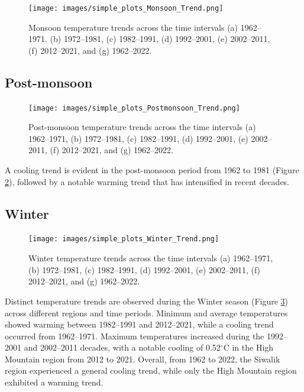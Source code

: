 \begin{figure}[H] 
  \centering
  \texttt{[image: images/simple\_plots\_Monsoon\_Trend.png]}  
  \caption{Monsoon temperature trends across the time intervals (a) 1962–1971, (b) 1972–1981, (c) 1982–1991, (d) 1992–2001, (e) 2002–2011, (f) 2012–2021, and (g) 1962–2022.} 
  \label{fig:Monsoon_temperature_trends}  
\end{figure}

\subsection*{Post-monsoon}

\begin{figure}[H] 
  \centering
  \texttt{[image: images/simple\_plots\_Postmonsoon\_Trend.png]}
  \caption{Post-monsoon temperature trends across the time intervals (a) 1962–1971, (b) 1972–1981, (c) 1982–1991, (d) 1992–2001, (e) 2002–2011, (f) 2012–2021, and (g) 1962–2022.}
  \label{fig:Post_monsoon_temperature_trends}  
\end{figure}

A cooling trend is evident in the post-monsoon period from 1962 to 1981 (Figure \ref{fig:Post_monsoon_temperature_trends}), followed by a notable warming trend that has intensified in recent decades.

\subsection*{Winter}

\begin{figure}[H] 
  \centering
  \texttt{[image: images/simple\_plots\_Winter\_Trend.png]}  
  \caption{Winter temperature trends across the time intervals (a) 1962–1971, (b) 1972–1981, (c) 1982–1991, (d) 1992–2001, (e) 2002–2011, (f) 2012–2021, and (g) 1962–2022.} 
  \label{fig:Winter_temperature_trends}  
\end{figure}


Distinct temperature trends are observed during the Winter season (Figure \ref{fig:Winter_temperature_trends}) across different regions and time periods. Minimum and average temperatures showed warming between 1982–1991 and 2012–2021, while a cooling trend occurred from 1962–1971. Maximum temperatures increased during the 1992–2001 and 2002–2011 decades, with a notable cooling of 0.52$^\circ$C in the High Mountain region from 2012 to 2021. Overall, from 1962 to 2022, the Siwalik region experienced a general cooling trend, while only the High Mountain region exhibited a warming trend.

